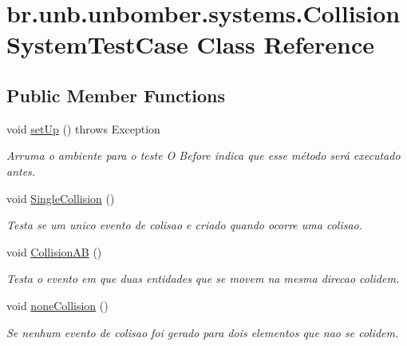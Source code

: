 \hypertarget{classbr_1_1unb_1_1unbomber_1_1systems_1_1_collision_system_test_case}{\section{br.\+unb.\+unbomber.\+systems.\+Collision\+System\+Test\+Case Class Reference}
\label{classbr_1_1unb_1_1unbomber_1_1systems_1_1_collision_system_test_case}
}
\subsection*{Public Member Functions}
\begin{DoxyCompactItemize}
\item 
void \hyperlink{classbr_1_1unb_1_1unbomber_1_1systems_1_1_collision_system_test_case_ac516e7051fdacf94d8239bfeabefdf62}{set\+Up} ()  throws Exception 
\begin{DoxyCompactList}\small\item\em Arruma o ambiente para o teste O Before indica que esse método será executado antes. \end{DoxyCompactList}\item 
void \hyperlink{classbr_1_1unb_1_1unbomber_1_1systems_1_1_collision_system_test_case_a5e74106b3718b2ba9b7eddb7bae92731}{Single\+Collision} ()
\begin{DoxyCompactList}\small\item\em Testa se um unico evento de colisao e criado quando ocorre uma colisao. \end{DoxyCompactList}\item 
void \hyperlink{classbr_1_1unb_1_1unbomber_1_1systems_1_1_collision_system_test_case_aa02f03a7c7bf89b621aaa1f42fc6c975}{Collision\+A\+B} ()
\begin{DoxyCompactList}\small\item\em Testa o evento em que duas entidades que se movem na mesma direcao colidem. \end{DoxyCompactList}\item 
void \hyperlink{classbr_1_1unb_1_1unbomber_1_1systems_1_1_collision_system_test_case_a6b995eac7927495a665ba59e6af0629c}{none\+Collision} ()
\begin{DoxyCompactList}\small\item\em Se nenhum evento de colisao foi gerado para dois elementos que nao se colidem. \end{DoxyCompactList}\end{DoxyCompactItemize}

